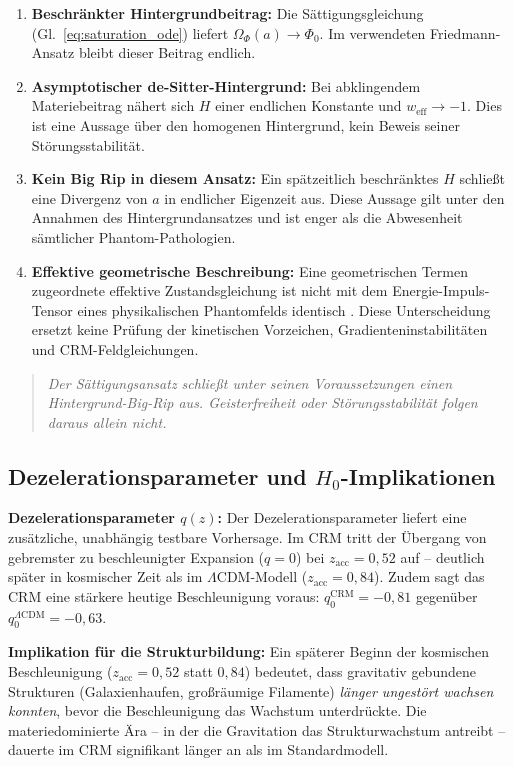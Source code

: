\documentclass[aps,prd,twocolumn,superscriptaddress,nofootinbib]{revtex4-2}
\begin{document}
\begin{enumerate}
\item \textbf{Beschränkter Hintergrundbeitrag:} Die Sättigungsgleichung (Gl.~\ref{eq:saturation_ode}) liefert $\Omega_\Phi(a)\to\Phi_0$. Im verwendeten Friedmann-Ansatz bleibt dieser Beitrag endlich.
\item \textbf{Asymptotischer de-Sitter-Hintergrund:} Bei abklingendem Materiebeitrag nähert sich $H$ einer endlichen Konstante und $w_{\mathrm{eff}}\to-1$. Dies ist eine Aussage über den homogenen Hintergrund, kein Beweis seiner Störungsstabilität.
\item \textbf{Kein Big Rip in diesem Ansatz:} Ein spätzeitlich beschränktes $H$ schließt eine Divergenz von $a$ in endlicher Eigenzeit aus. Diese Aussage gilt unter den Annahmen des Hintergrundansatzes und ist enger als die Abwesenheit sämtlicher Phantom-Pathologien.
\item \textbf{Effektive geometrische Beschreibung:} Eine geometrischen Termen zugeordnete effektive Zustandsgleichung ist nicht mit dem Energie-Impuls-Tensor eines physikalischen Phantomfelds identisch \cite{Sotiriou2010}. Diese Unterscheidung ersetzt keine Prüfung der kinetischen Vorzeichen, Gradienteninstabilitäten und CRM-Feldgleichungen.
\end{enumerate}

\begin{quote}
\textit{Der Sättigungsansatz schließt unter seinen Voraussetzungen einen Hintergrund-Big-Rip aus. Geisterfreiheit oder Störungsstabilität folgen daraus allein nicht.}
\end{quote}

\subsection{Dezelerationsparameter und $H_0$-Implikationen}
\label{subsec:deceleration}

\textbf{Dezelerationsparameter $q(z)$:} Der Dezelerationsparameter liefert eine zusätzliche, unabhängig testbare Vorhersage. Im CRM tritt der Übergang von gebremster zu beschleunigter Expansion ($q = 0$) bei $z_{\mathrm{acc}} = 0{,}52$ auf -- deutlich später in kosmischer Zeit als im $\Lambda$CDM-Modell ($z_{\mathrm{acc}} = 0{,}84$). Zudem sagt das CRM eine stärkere heutige Beschleunigung voraus: $q_0^{\mathrm{CRM}} = -0{,}81$ gegenüber $q_0^{\Lambda\mathrm{CDM}} = -0{,}63$.

\textbf{Implikation für die Strukturbildung:} Ein späterer Beginn der kosmischen Beschleunigung ($z_{\mathrm{acc}} = 0{,}52$ statt $0{,}84$) bedeutet, dass gravitativ gebundene Strukturen (Galaxienhaufen, großräumige Filamente) \textit{länger ungestört wachsen konnten}, bevor die Beschleunigung das Wachstum unterdrückte. Die materiedominierte Ära -- in der die Gravitation das Strukturwachstum antreibt -- dauerte im CRM signifikant länger an als im Standardmodell.
\end{document}
